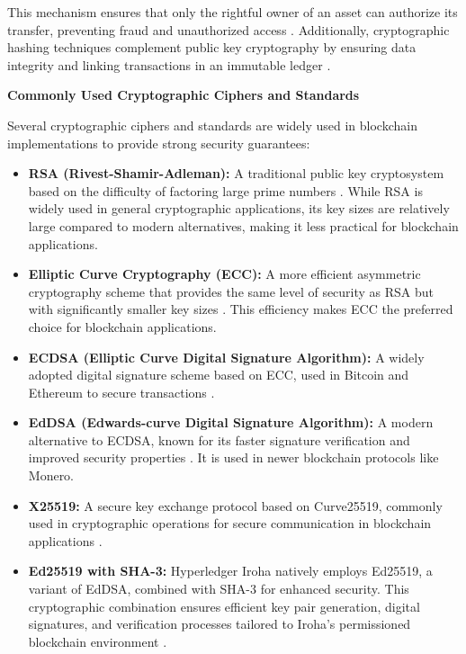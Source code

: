 \documentclass[final]{rc-book-2.14}
\begin{document}
This mechanism ensures that only the rightful owner of an asset can authorize its transfer, preventing fraud and unauthorized access \cite{wood2014ethereum}. Additionally, cryptographic hashing techniques complement public key cryptography by ensuring data integrity and linking transactions in an immutable ledger \cite{merkle1988digital}.

\textbf{Commonly Used Cryptographic Ciphers and Standards}

Several cryptographic ciphers and standards are widely used in blockchain implementations to provide strong security guarantees:

\begin{itemize}
    \item \textbf{RSA (Rivest-Shamir-Adleman):} A traditional public key cryptosystem based on the difficulty of factoring large prime numbers \cite{rivest1978method}. While RSA is widely used in general cryptographic applications, its key sizes are relatively large compared to modern alternatives, making it less practical for blockchain applications.
    \item \textbf{Elliptic Curve Cryptography (ECC):} A more efficient asymmetric cryptography scheme that provides the same level of security as RSA but with significantly smaller key sizes \cite{miller1986use}. This efficiency makes ECC the preferred choice for blockchain applications.
    \item \textbf{ECDSA (Elliptic Curve Digital Signature Algorithm):} A widely adopted digital signature scheme based on ECC, used in Bitcoin and Ethereum to secure transactions \cite{johnson2001elliptic}.
    \item \textbf{EdDSA (Edwards-curve Digital Signature Algorithm):} A modern alternative to ECDSA, known for its faster signature verification and improved security properties \cite{bernstein2012high}. It is used in newer blockchain protocols like Monero.
    \item \textbf{X25519:} A secure key exchange protocol based on Curve25519, commonly used in cryptographic operations for secure communication in blockchain applications \cite{langley2016curve25519}.
    \item \textbf{Ed25519 with SHA-3:} Hyperledger Iroha natively employs Ed25519, a variant of EdDSA, combined with SHA-3 for enhanced security. This cryptographic combination ensures efficient key pair generation, digital signatures, and verification processes tailored to Iroha’s permissioned blockchain environment \cite{hyperledger_iroha}.
\end{itemize}
\end{document}
